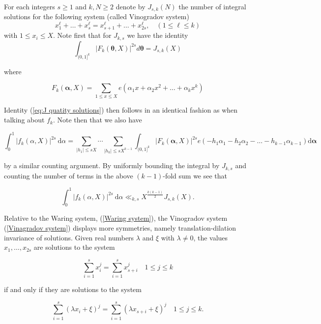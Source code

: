 For each integers $s \geq 1$ and $k, N \geq 2$ denote by $J_{s, k}(N)$ the number of integral solutions for the following system (called Vinogradov system)
\begin{equation}\label{Vinagradov system}
x_{1}^{\ell}+\ldots+x_{s}^{\ell}=x_{s+1}^{\ell}+\ldots+x_{2 s}^{\ell}, \quad(1 \leq \ell \leq k)
\end{equation}
with $1 \leq x_{i} \leq X$. Note first that for $J_{k, s}$ we have the identity
\begin{equation}\label{eq:J quatity solutions}
\int_{(0,1]^{k}}\left|F_{k}(\boldsymbol{\theta}, X)\right|^{2 s} d\boldsymbol{\theta}=J_{s, k}(X)
\end{equation}


where

$$
F_{k}(\boldsymbol{\alpha}, X)=\sum_{1 \leq x \leq X} e\left(\alpha_{1} x+\alpha_{2} x^{2}+\ldots+\alpha_{k} x^{k}\right)
$$

Identity (\ref{eq:J quatity solutions}) then follows in an identical fashion as when talking about $f_{k}$. Note then that we also have

$$
\int_{0}^{1}\left|f_{k}(\alpha, X)\right|^{2 s} \mathrm{~d} \alpha=\sum_{\left|h_{1}\right| \leq s X} \cdots \sum_{\left|h_{k}\right| \leq s X^{k-1}} \int_{(0,1]^{k}}\left|F_{k}(\boldsymbol{\alpha}, X)\right|^{2 s} e\left(-h_{1} \alpha_{1}-h_{2} \alpha_{2}-\ldots-h_{k-1} \alpha_{k-1}\right) \mathrm{d} \boldsymbol{\alpha}
$$

by a similar counting argument. By uniformly bounding the integral by $J_{k, s}$ and counting the number of terms in the above $(k-1)$-fold sum we see that

$$
\int_{0}^{1}\left|f_{k}(\alpha, X)\right|^{2 s} \mathrm{~d} \alpha \ll_{k, s} X^{\frac{k(k-1)}{2}} J_{s, k}(X).
$$

Relative to the Waring system, (\ref{Waring system}), the Vinogradov system (\ref{Vinagradov system}) displays more symmetries, namely translation-dilation invariance of solutions.
 Given real numbers \(\lambda\) and \(\xi\) with \(\lambda \neq 0\), the values \(x_{1}, \ldots, x_{2s}\) are solutions to the system

\begin{equation}\label{eq:Vinogradov 2}
\sum_{i=1}^{s} x_{i}^{j} = \sum_{i=1}^{s} x_{s+i}^{j} \quad 1 \leq j \leq k
\end{equation}

if and only if they are solutions to the system

$$
\sum_{i=1}^{s}\left(\lambda x_{i} + \xi\right)^{j} = \sum_{i=1}^{s}\left(\lambda x_{s+i} + \xi\right)^{j} \quad 1 \leq j \leq k.
$$

